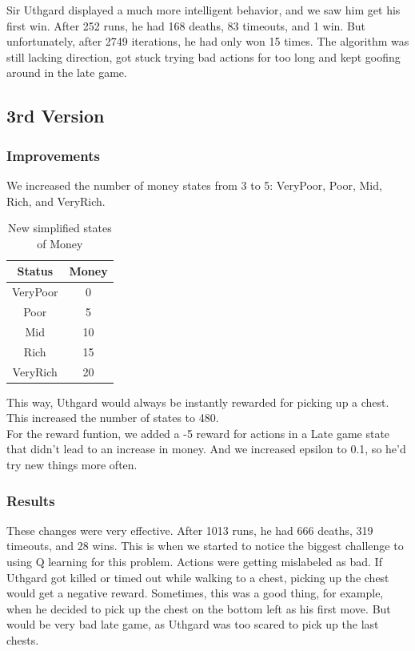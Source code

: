 \documentclass{article}
\begin{document}
  Sir Uthgard displayed a much more intelligent behavior, and we saw him get his first win. After 252 runs, he had 168 deaths, 83 timeouts, and 1 win. 
  But unfortunately, after 2749 iterations, he had only won 15 times. The algorithm was still lacking direction, got stuck trying bad actions for too long and kept goofing around in the late game.

  \subsection{3rd Version}

  \subsubsection{Improvements}

  We increased the number of money states from 3 to 5: VeryPoor, Poor, Mid, Rich, and VeryRich. 
  
  \begin{table}[h!]
    \centering
    \caption{New simplified states of Money}
    \label{tab:moneyStates2}
    \begin{tabular}{c|c}
      \textbf{Status} & \textbf{Money}\\
      \hline
      VeryPoor & 0\\
      Poor & 5\\
      Mid & 10\\
      Rich & 15\\
      VeryRich & 20\\
    \end{tabular}
  \end{table}
  \noindent
  This way, Uthgard would always be instantly rewarded for picking up a chest. This increased the number of states to 480. \\
  For the reward funtion, we added a -5 reward for actions in a Late game state that didn't lead to an increase in money. And we increased epsilon to 0.1, so he'd try new things more often.

  \subsubsection{Results}

  These changes were very effective. After 1013 runs, he had 666 deaths, 319 timeouts, and 28 wins. This is when we started to notice the biggest challenge to using Q learning for this problem. 
  Actions were getting mislabeled as bad. If Uthgard got killed or timed out while walking to a chest, picking up the chest would get a negative reward. 
  Sometimes, this was a good thing, for example, when he decided to pick up the chest on the bottom left as his first move. But would be very bad late game, as Uthgard was too scared to pick up the last chests.
\end{document}
